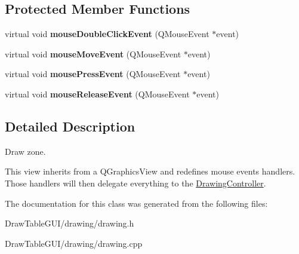 \subsection*{Protected Member Functions}
\begin{DoxyCompactItemize}
\item 
\hypertarget{classDrawing_a4556d01cb5fe7d42a5bd530d40555dac}{}virtual void {\bfseries mouse\+Double\+Click\+Event} (Q\+Mouse\+Event $\ast$event)\label{classDrawing_a4556d01cb5fe7d42a5bd530d40555dac}

\item 
\hypertarget{classDrawing_a954e6bc41bb447d9aeebfacdc3fa4a4d}{}virtual void {\bfseries mouse\+Move\+Event} (Q\+Mouse\+Event $\ast$event)\label{classDrawing_a954e6bc41bb447d9aeebfacdc3fa4a4d}

\item 
\hypertarget{classDrawing_a18f088fb04f075b3db742167c3506a5c}{}virtual void {\bfseries mouse\+Press\+Event} (Q\+Mouse\+Event $\ast$event)\label{classDrawing_a18f088fb04f075b3db742167c3506a5c}

\item 
\hypertarget{classDrawing_a1e14bffc7679a2eb2765f49cecc988d0}{}virtual void {\bfseries mouse\+Release\+Event} (Q\+Mouse\+Event $\ast$event)\label{classDrawing_a1e14bffc7679a2eb2765f49cecc988d0}

\end{DoxyCompactItemize}


\subsection{Detailed Description}
Draw zone. 

This view inherits from a Q\+Graphics\+View and redefines mouse events handlers. Those handlers will then delegate everything to the \hyperlink{classDrawingController}{Drawing\+Controller}. 

The documentation for this class was generated from the following files\+:\begin{DoxyCompactItemize}
\item 
Draw\+Table\+G\+U\+I/drawing/drawing.\+h\item 
Draw\+Table\+G\+U\+I/drawing/drawing.\+cpp\end{DoxyCompactItemize}
